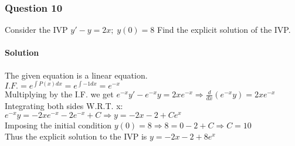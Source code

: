 \documentclass{article}
\begin{document}
\subsubsection{Question 10}
Consider the IVP $y'-y=2x;\;y(0)=8$
Find the explicit solution of the IVP.

\paragraph{Solution}
The given equation is a linear equation.
\\$I.F.=e^{\int P(x)dx}=e^{\int -1dx}=e^{-x}$
\\Multiplying by the I.F. we get $e^{-x}y'-e^{-x}y=2xe^{-x}
\Rightarrow\frac{d}{dx}(e^{-x}y)=2xe^{-x}$
\\Integrating both sides W.R.T. x: $e^{-x}y=-2xe^{-x}-2e^{-x}+C\Rightarrow y=-2x-2+Ce^x$
\\Imposing the initial condition $y(0)=8\Rightarrow 8=0-2+C\Rightarrow C=10$
\\Thus the explicit solution to the IVP is $y=-2x-2+8e^x$

\end{document}
